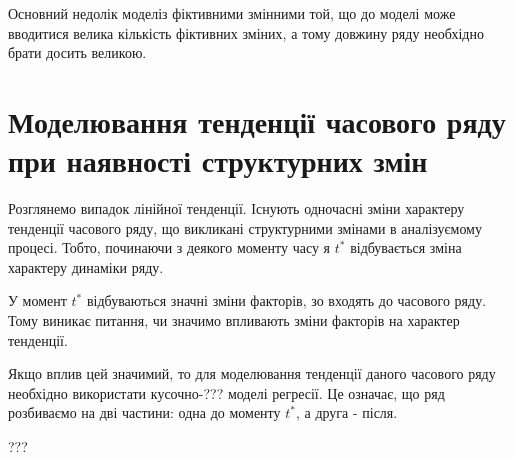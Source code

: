 \documentclass[a4paper, fontsize=10pt, oneside]{article}
\begin{document}
Основний недолік моделіз фіктивними змінними той, що до моделі може вводитися велика кількість фіктивних зміних, а тому довжину ряду необхідно брати досить великою.

\chapter{\Large \bf Моделювання тенденції часового ряду при наявності структурних змін}

Розглянемо випадок лінійної тенденції. Існують одночасні зміни характеру тенденції часового ряду, що викликані структурними змінами в аналізуємому процесі. Тобто, починаючи з деякого моменту часу я $t^{*}$ відбувається зміна характеру динаміки ряду.

У момент $t^{*}$ відбуваються значні зміни факторів, зо входять до часового ряду. Тому виникає питання, чи значимо впливають зміни факторів на характер тенденції.

Якщо вплив цей значимий, то для моделювання тенденції даного часового ряду необхідно використати кусочно-??? моделі регресії. Це означає, що ряд розбиваємо на дві частини: одна до моменту $t^{*}$, а друга - після.

???
\end{document}
